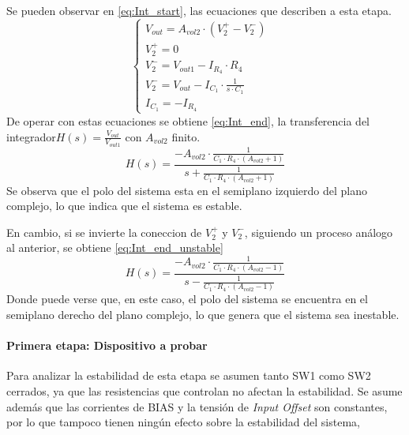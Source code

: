 Se pueden observar en \ref{eq:Int_start}, las ecuaciones que describen a esta etapa.
\begin{equation}
    \left\{
    \begin{array}{lllll}
        V_{out}=A_{vol2} \cdot (V_2^+ - V_2^-)\\
        
        V_2^+ = 0 &\\
        
        V_2^- = V_{out1} - I_{R_4} \cdot R_4\\
        
        V_2^- = V_{out} - I_{C_1} \cdot \frac{1}{s\cdot C_1}\\
        
        I_{C_1} = -I_{R_4}
    \end{array}
  \right.
  \label{eq:Int_start}
\end{equation}
De operar con estas ecuaciones se obtiene \ref{eq:Int_end}, la transferencia del integrador$H(s) = \frac{ V_{out}}{V_{out1}}$ con $A_{vol2}$ finito. 
\begin{equation}
    H(s) = \frac{-A_{vol2}\cdot \frac{1}{C_1 \cdot R_4 \cdot \left(A_{vol2} + 1 \right) }}{s + \frac{1}{C_1 \cdot R_4 \cdot \left(A_{vol2} + 1 \right)}}
    \label{eq:Int_end}
\end{equation}
Se observa que el polo del sistema esta en el semiplano izquierdo del plano complejo, lo que indica que el sistema es estable.

En cambio, si se invierte la coneccion de $V_2^+$ y $V_2^-$, siguiendo un proceso an\'alogo al anterior, se obtiene \ref{eq:Int_end_unstable}
\begin{equation}
    H(s) = \frac{-A_{vol2}\cdot \frac{1}{C_1 \cdot R_4 \cdot \left(A_{vol2} - 1 \right) }}{s - \frac{1}{C_1 \cdot R_4 \cdot \left(A_{vol2} - 1 \right)}}
    \label{eq:Int_end_unstable}
\end{equation}
Donde puede verse que, en este caso, el polo del sistema se encuentra en el semiplano derecho del plano complejo, lo que genera que el sistema sea inestable.\par




\paragraph{Primera etapa: Dispositivo a probar}
Para analizar la estabilidad de esta etapa se asumen tanto SW1 como SW2 cerrados, ya que las resistencias que controlan no afectan la estabilidad. Se asume adem\'as que las corrientes de BIAS y la tensi\'on de \textit{Input Offset} son constantes, por lo que tampoco tienen ning\'un efecto sobre la estabilidad del sistema, 


